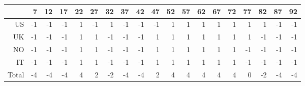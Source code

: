 \begin{table}[ht]
\centering
\begin{tabular}{rrrrrrrrrrrrrrrrrrr}
  \hline
 & 7 & 12 & 17 & 22 & 27 & 32 & 37 & 42 & 47 & 52 & 57 & 62 & 67 & 72 & 77 & 82 & 87 & 92 \\ 
  \hline
US & -1 & -1 & -1 & 1 & -1 & 1 & -1 & -1 & -1 & 1 & 1 & 1 & 1 & 1 & 1 & 1 & -1 & -1 \\ 
  UK & -1 & -1 & -1 & 1 & 1 & -1 & -1 & -1 & 1 & 1 & 1 & 1 & 1 & 1 & 1 & -1 & -1 & -1 \\ 
  NO & -1 & -1 & -1 & 1 & 1 & -1 & -1 & -1 & 1 & 1 & 1 & 1 & 1 & 1 & -1 & -1 & -1 & -1 \\ 
  IT & -1 & -1 & -1 & 1 & 1 & -1 & -1 & -1 & 1 & 1 & 1 & 1 & 1 & 1 & -1 & -1 & -1 & -1 \\ 
  Total & -4 & -4 & -4 & 4 & 2 & -2 & -4 & -4 & 2 & 4 & 4 & 4 & 4 & 4 & 0 & -2 & -4 & -4 \\ 
   \hline
\end{tabular}
\end{table}
